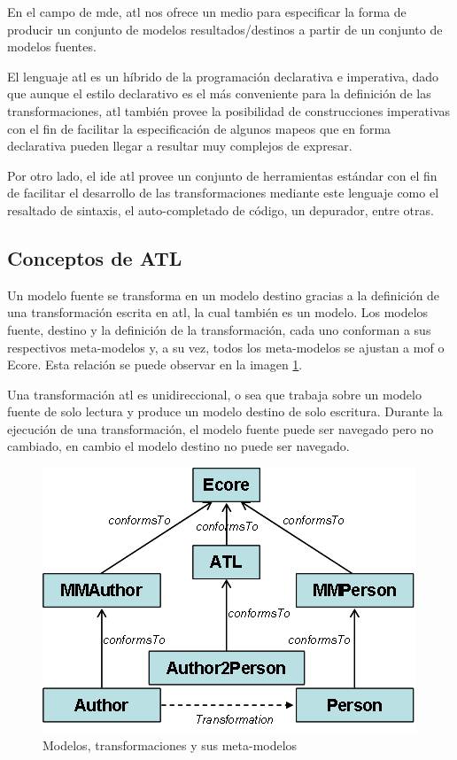 \documentclass[a4paper,12pt,oneside,spanish]{book}
\begin{document}
En el campo de \gls{mde}, \gls{atl} nos ofrece un medio para especificar la forma de producir un conjunto de modelos resultados/destinos a partir de un conjunto de modelos fuentes.

El lenguaje \gls{atl} es un híbrido de la programación declarativa e imperativa, dado que aunque el estilo declarativo es el más conveniente para la definición de las transformaciones, \gls{atl} también provee la posibilidad de construcciones imperativas con el fin de facilitar la especificación de algunos mapeos que en forma declarativa pueden llegar a resultar muy complejos de expresar.

Por otro lado, el \gls{ide} \gls{atl} provee un conjunto de herramientas estándar con el fin de facilitar el desarrollo de las transformaciones mediante este lenguaje como el  resaltado de sintaxis, el auto-completado de código, un depurador, entre otras.



\subsection{Conceptos de ATL}

Un modelo fuente se transforma en un modelo destino gracias a la definición de una transformación escrita en \gls{atl}, la cual también es un modelo. Los modelos fuente, destino y la definición de la transformación, cada uno conforman a sus respectivos meta-modelos y, a su vez, todos los meta-modelos se ajustan a \gls{mof} o Ecore. Esta relación se puede observar en la imagen \ref{ATL-concepts}.

Una transformación \gls{atl} es unidireccional, o sea que trabaja sobre un modelo fuente de solo lectura y produce un modelo destino de solo escritura. Durante la ejecución de una transformación, el modelo fuente puede ser navegado pero no cambiado, en cambio el modelo destino no puede ser navegado.

\begin{figure}[hbtp]
\centering
\includegraphics[scale=.65]{./img/ATL-concepts}
\caption{Modelos, transformaciones y sus meta-modelos}
\label{ATL-concepts}
\end{figure}
\end{document}
